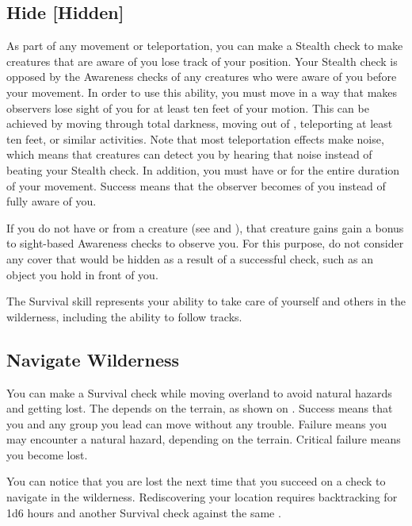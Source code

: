     \subsection{Hide [Hidden]}\label{Hide}
        As part of any movement or teleportation, you can make a Stealth check to make creatures that are aware of you lose track of your position.
        Your Stealth check is opposed by the Awareness checks of any creatures who were aware of you before your movement.
        In order to use this ability, you must move in a way that makes observers lose sight of you for at least ten feet of your motion.
        This can be achieved by moving through total darkness, moving out of , teleporting at least ten feet, or similar activities.
        Note that most teleportation effects make noise, which means that creatures can detect you by hearing that noise instead of beating your Stealth check.
        In addition, you must have  or  for the entire duration of your movement.
        Success means that the observer becomes \partiallyunaware of you instead of fully aware of you.

        If you do not have  or  from a creature (see  and ), that creature gains gain a  bonus to sight-based Awareness checks to observe you.
        For this purpose, do not consider any cover that would be hidden as a result of a successful check, such as an object you hold in front of you.

\newpage
{}
        The Survival skill represents your ability to take care of yourself and others in the wilderness, including the ability to follow tracks.

    \subsection{Navigate Wilderness}
        You can make a Survival check while moving overland to avoid natural hazards and getting lost. The  depends on the terrain, as shown on . Success means that you and any group you lead can move without any trouble. Failure means you may encounter a natural hazard, depending on the terrain. Critical failure means you become lost.

        You can notice that you are lost the next time that you succeed on a check to navigate in the wilderness. Rediscovering your location requires backtracking for 1d6 hours and another Survival check against the same .

